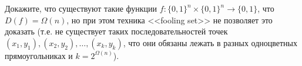 Докажите, что существуют такие функции $f\colon \{0, 1\}^n \times \{0, 1\}^n \to \{0, 1\}$, что $D(f) =
\Omega(n)$, но при этом техника <<fooling set>> не позволяет это доказать (т.е. не существует таких
последовательностей точек $(x_1, y_1), (x_2, y_2), \dots, (x_k, y_k)$, что они обязаны лежать в разных
одноцветных прямоугольниках и $k = 2^{\Omega(n)}$).